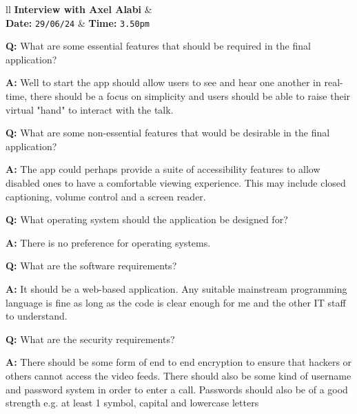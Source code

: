 \begin{tcolorbox}[
  boxrule=0pt, frame empty, colback=lightgray, arc=0pt
]
  \begin{tblr}{ll}
    \textbf{Interview with Axel Alabi} & {}\\
    \textbf{Date: } \texttt{29/06/24} &
    {\hspace{-1.5cm} \textbf{Time: } \texttt{3.50pm}}
  \end{tblr}

  \vspace{0.2cm}

  \textbf{Q:} What are some essential features that should be
  required in the final application? \vspace{0.05cm}

  \textbf{A:} Well to start the app should allow users to see 
  and hear one another in real-time, there should be a focus on
  simplicity and users should be able to raise their virtual 
  "hand" to interact with the talk. \vspace{0.25cm}

  \textbf{Q:} What are some non-essential features that would
  be desirable in the final application? \vspace{0.05cm}

  \textbf{A:} The app could perhaps provide a suite of 
  accessibility features to allow disabled ones to have a 
  comfortable viewing experience. This may include closed
  captioning, volume control and a screen reader.
  \vspace{0.25cm}

  \textbf{Q:} What operating system should the application be 
  designed for? \vspace{0.05cm}

  \textbf{A:} There is no preference for operating systems.
  \vspace{0.25cm}

  \textbf{Q:} What are the software requirements? 
  \vspace{0.05cm}

  \textbf{A:} It should be a web-based application. Any 
  suitable mainstream programming language is fine as long as 
  the code is clear enough for me and the other IT staff to 
  understand.
  \vspace{0.25cm}

  \textbf{Q:} What are the security requirements?
  \vspace{0.05cm}

  \textbf{A:} There should be some form of end to end 
  encryption to ensure that hackers or others cannot access the  video feeds. There should also be some kind of username and 
  password system in order to enter a call. Passwords should 
  also be of a good strength e.g. at least 1 symbol, capital
  and lowercase letters
  \vspace{0.25cm}


\end{tcolorbox}

